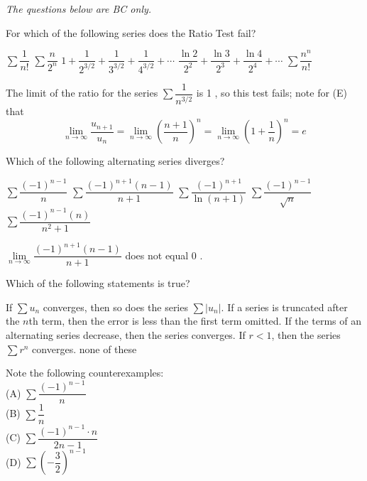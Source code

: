 \textit{The questions below are BC only.}

\question
For which of the following series does the Ratio Test fail?
\begin{choices}
  \choice $\sum \dfrac{1}{n!}$
  \choice $\sum \dfrac{n}{2^{n}}$
  \CorrectChoice $1+\dfrac{1}{2^{3 / 2}}+\dfrac{1}{3^{3 / 2}}+\dfrac{1}{4^{3 / 2}}+\cdots$
  \choice $\dfrac{\ln 2}{2^{2}}+\dfrac{\ln 3}{2^{3}}+\dfrac{\ln 4}{2^{4}}+\cdots$
  \choice $\sum \dfrac{n^{n}}{n!}$
\end{choices}
\begin{solution}
The limit of the ratio for the series $\sum \dfrac{1}{n^{3 / 2}}$ is 1 , so this test fails; note for (E) that
\[
\lim\limits_{n \to \infty} \dfrac{u_{n+1}}{u_{n}}=\lim\limits_{n \to \infty}\left(\dfrac{n+1}{n}\right)^{n}=\lim\limits_{n \to \infty}\left(1+\dfrac{1}{n}\right)^{n}=e
\]
\end{solution}



\newpage




\question
Which of the following alternating series diverges?
\begin{choices}
  \choice $\sum \dfrac{(-1)^{n-1}}{n}$
  \CorrectChoice $\sum \dfrac{(-1)^{n+1}(n-1)}{n+1}$
  \choice $\sum \dfrac{(-1)^{n+1}}{\ln (n+1)}$
  \choice $\sum \dfrac{(-1)^{n-1}}{\sqrt{n}}$
  \choice $\sum \dfrac{(-1)^{n-1}(n)}{n^{2}+1}$
\end{choices}
\begin{solution}
$\lim\limits_{n \to \infty} \dfrac{(-1)^{n+1}(n-1)}{n+1}$ does not equal 0 .
\end{solution}

\question
Which of the following statements is true?
\begin{choices}
  \choice If $\sum u_{n}$ converges, then so does the series $\sum\left|u_{n}\right|$.
  \choice If a series is truncated after the $n$th term, then the error is less than the first term omitted.
  \choice If the terms of an alternating series decrease, then the series converges.
  \choice If $r<1$, then the series $\sum r^{n}$ converges.
  \CorrectChoice none of these
\end{choices}
\begin{solution}
Note the following counterexamples:\\
(A) $\sum \dfrac{(-1)^{n-1}}{n}$\\
(B) $\sum \dfrac{1}{n}$\\
(C) $\sum \dfrac{(-1)^{n-1} \cdot n}{2 n-1}$\\
(D) $\sum\left(-\dfrac{3}{2}\right)^{n-1}$
\end{solution}

